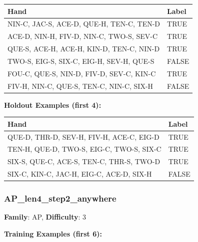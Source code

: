 \documentclass[10pt,a4paper]{article}
\begin{document}
\begin{small}
\begin{tabular}{p{8cm}l}
\toprule
Hand & Label \\
\midrule
NIN-C, JAC-S, ACE-D, QUE-H, TEN-C, TEN-D & \textcolor{positive}{TRUE} \\
ACE-D, NIN-H, FIV-D, NIN-C, TWO-S, SEV-C & \textcolor{positive}{TRUE} \\
QUE-S, ACE-H, ACE-H, KIN-D, TEN-C, NIN-D & \textcolor{positive}{TRUE} \\
TWO-S, EIG-S, SIX-C, EIG-H, SEV-H, QUE-S & \textcolor{negative}{FALSE} \\
FOU-C, QUE-S, NIN-D, FIV-D, SEV-C, KIN-C & \textcolor{positive}{TRUE} \\
FIV-H, NIN-C, QUE-S, TEN-C, NIN-C, SIX-H & \textcolor{negative}{FALSE} \\
\bottomrule
\end{tabular}
\end{small}

\textbf{Holdout Examples (first 4):}

\begin{small}
\begin{tabular}{p{8cm}l}
\toprule
Hand & Label \\
\midrule
QUE-D, THR-D, SEV-H, FIV-H, ACE-C, EIG-D & \textcolor{positive}{TRUE} \\
TEN-H, QUE-D, TWO-S, EIG-C, TWO-S, SIX-C & \textcolor{positive}{TRUE} \\
SIX-S, QUE-C, ACE-S, TEN-C, THR-S, TWO-D & \textcolor{positive}{TRUE} \\
SIX-C, KIN-C, JAC-H, EIG-C, ACE-D, SIX-H & \textcolor{negative}{FALSE} \\
\bottomrule
\end{tabular}
\end{small}

\vspace{0.5cm}

\subsubsection{AP\_len4\_step2\_anywhere}

\textbf{Family}: AP, \textbf{Difficulty}: 3

\textbf{Training Examples (first 6):}
\end{document}
